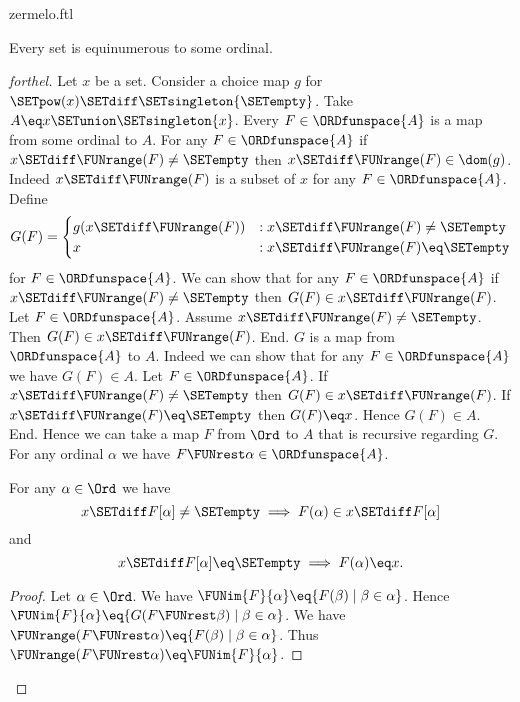 \documentclass{naproche-library}
\begin{document}
\begin{smodule}[title=Zermelo's Well-Ordering Theorem]{zermelo.ftl}

\begin{theorem}[forthel,title=Zermelo's Well-Ordering Theorem,id=zermelo]
  Every set is equinumerous to some ordinal.
\end{theorem}
\begin{proof}[forthel]
  Let $x$ be a set.
  Consider a choice map $g$ for $\SETpow(x) \SETdiff \SETsingleton{\SETempty}$.
  Take $A \eq x \SETunion \SETsingleton{x}$.
  Every $F \in \ORDfunspace{A}$ is a map from some ordinal to $A$.
  For any $F \in \ORDfunspace{A}$ if $x \SETdiff \FUNrange(F) \neq \SETempty$ then $x \SETdiff \FUNrange(F) \in \dom(g)$.
  Indeed $x \SETdiff \FUNrange(F)$ is a subset of $x$ for any $F \in \ORDfunspace{A}$.
  Define \[ G(F) =
    \begin{cases}
      g(x \SETdiff \FUNrange(F))
      & : x \SETdiff \FUNrange(F) \neq \SETempty
      \\
      x
      & : x \SETdiff \FUNrange(F) \eq \SETempty
    \end{cases} \]
  for $F \in \ORDfunspace{A}$.
  We can show that for any $F \in \ORDfunspace{A}$ if $x \SETdiff \FUNrange(F) \neq \SETempty$ then $G(F) \in x \SETdiff \FUNrange(F)$.
    Let $F \in \ORDfunspace{A}$.
    Assume $x \SETdiff \FUNrange(F) \neq \SETempty$.  
    Then $G(F) \in x \SETdiff \FUNrange(F)$.
  End.
  $G$ is a map from $\ORDfunspace{A}$ to $A$.
  Indeed we can show that for any $F \in \ORDfunspace{A}$ we have $G(F) \in A$.
    Let $F \in \ORDfunspace{A}$.
    If $x \SETdiff \FUNrange(F) \neq \SETempty$ then $G(F) \in x \SETdiff \FUNrange(F)$.
    If $x \SETdiff \FUNrange(F) \eq \SETempty$ then $G(F) \eq x$.
    Hence $G(F) \in A$.
  End.
  Hence we can take a map $F$ from $\Ord$ to $A$ that is recursive regarding $G$.
  For any ordinal $\alpha$ we have $F \FUNrest \alpha \in \ORDfunspace{A}$.

  For any $\alpha \in \Ord$ we have
  \[ x \SETdiff F[\alpha] \neq \SETempty \implies F(\alpha) \in x \SETdiff F[\alpha] \]
  and
  \[ x \SETdiff F[\alpha] \eq \SETempty \implies F(\alpha) \eq x. \]
  \begin{proof}
    Let $\alpha \in \Ord$.
    We have $\FUNim{F}{\alpha} \eq \{ F(\beta) \mid \beta \in \alpha \}$.
    Hence $\FUNim{F}{\alpha} \eq \{ G(F \FUNrest \beta) \mid \beta \in \alpha \}$.
    We have $\FUNrange(F \FUNrest \alpha) \eq \{ F(\beta) \mid \beta \in \alpha \}$.
    Thus $\FUNrange(F \FUNrest \alpha) \eq \FUNim{F}{\alpha}$.


\end{proof}
\end{proof}
\end{smodule}
\end{document}
